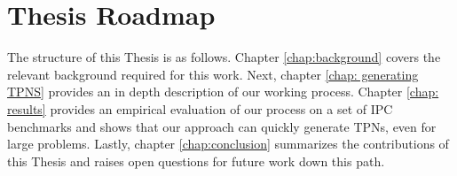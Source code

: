 \section{Thesis Roadmap}
\label{intro: Thesis Roadmap}

The structure of this Thesis is as follows.
Chapter \ref{chap:background} covers the relevant background required for this work.
Next, chapter \ref{chap: generating TPNS} provides an in depth description of our working process.
Chapter \ref{chap: results} provides an empirical evaluation of our process on a set of IPC benchmarks and shows that our approach can quickly generate TPNs, even for large problems.
Lastly, chapter \ref{chap:conclusion} summarizes the contributions of this Thesis and raises open questions for future work down this path.
